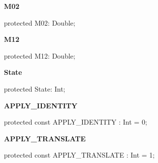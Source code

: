 \documentclass{report}
\newif\ifpdf
\begin{document}
\begin{list}{}
\begin{flushleft}
\ifpdf
\end{flushleft}
\fi


\par  \label{NewPascal.GUI.Geom.AffineTransform-M02}
\item[\textbf{M02}\hfill]
\ifpdf
\begin{flushleft}
\fi
\begin{ttfamily}
protected M02: Double;\end{ttfamily}

\ifpdf
\end{flushleft}
\fi


\par  \label{NewPascal.GUI.Geom.AffineTransform-M12}
\item[\textbf{M12}\hfill]
\ifpdf
\begin{flushleft}
\fi
\begin{ttfamily}
protected M12: Double;\end{ttfamily}

\ifpdf
\end{flushleft}
\fi


\par  \label{NewPascal.GUI.Geom.AffineTransform-State}
\item[\textbf{State}\hfill]
\ifpdf
\begin{flushleft}
\fi
\begin{ttfamily}
protected State: Int;\end{ttfamily}

\ifpdf
\end{flushleft}
\fi


\par  \label{NewPascal.GUI.Geom.AffineTransform-APPLY_IDENTITY}
\item[\textbf{APPLY{\_}IDENTITY}\hfill]
\ifpdf
\begin{flushleft}
\fi
\begin{ttfamily}
protected const APPLY{\_}IDENTITY           : Int = 0;\end{ttfamily}

\ifpdf
\end{flushleft}
\fi


\par  \label{NewPascal.GUI.Geom.AffineTransform-APPLY_TRANSLATE}
\item[\textbf{APPLY{\_}TRANSLATE}\hfill]
\ifpdf
\begin{flushleft}
\fi
\begin{ttfamily}
protected const APPLY{\_}TRANSLATE          : Int = 1;\end{ttfamily}


\end{flushleft}
\end{list}
\end{document}
